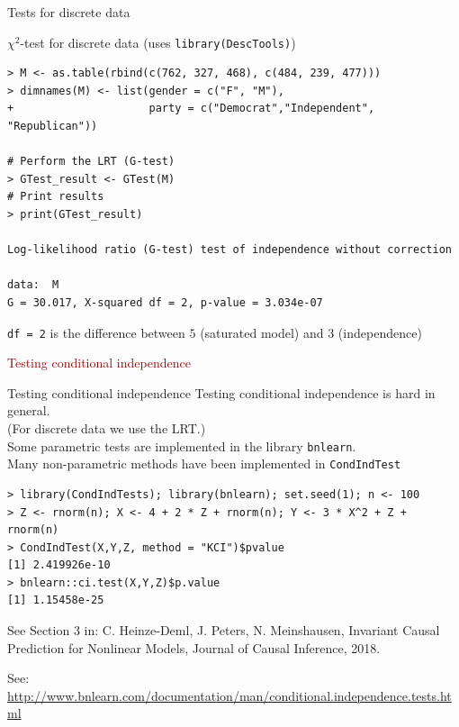 \documentclass[11pt,handout,aspectratio=169,dvipsnames]{beamer}
\begin{document}
\begin{frame}[fragile]{Tests for discrete data}
	\begin{alertblock}{$\chi^2$-test for discrete data (uses \texttt{library(DescTools)})}
   \begin{lstlisting}
> M <- as.table(rbind(c(762, 327, 468), c(484, 239, 477)))
> dimnames(M) <- list(gender = c("F", "M"),
+                     party = c("Democrat","Independent", "Republican"))

# Perform the LRT (G-test)
> GTest_result <- GTest(M)
# Print results
> print(GTest_result)

Log-likelihood ratio (G-test) test of independence without correction

data:  M
G = 30.017, X-squared df = 2, p-value = 3.034e-07
      \end{lstlisting}
\end{alertblock}
\texttt{df = 2} is the difference between $5$ (saturated model) and $3$ (independence)
\end{frame}

\begin{frame}{}
\begin{center}
	{\huge \textcolor{DarkRed}{Testing conditional independence}}
\end{center}
\end{frame}


\begin{frame}[fragile]{Testing conditional independence}
Testing conditional independence is hard in general.\\[.2cm] 
(For discrete data we use the LRT.)\\[.2cm]

Some parametric tests are implemented in the library \texttt{bnlearn}.\\
Many non-parametric methods have been implemented in \texttt{CondIndTest}
 \begin{lstlisting}
> library(CondIndTests); library(bnlearn); set.seed(1); n <- 100
> Z <- rnorm(n); X <- 4 + 2 * Z + rnorm(n); Y <- 3 * X^2 + Z + rnorm(n)
> CondIndTest(X,Y,Z, method = "KCI")$pvalue 
[1] 2.419926e-10
> bnlearn::ci.test(X,Y,Z)$p.value 
[1] 1.15458e-25
\end{lstlisting}
\medskip

{\scriptsize See Section 3 in: 
C. Heinze-Deml, J. Peters, N. Meinshausen, Invariant Causal Prediction for Nonlinear Models, Journal of Causal Inference, 2018.}
\bigskip

{\scriptsize See: \url{http://www.bnlearn.com/documentation/man/conditional.independence.tests.html}}
\end{frame}
\end{document}
